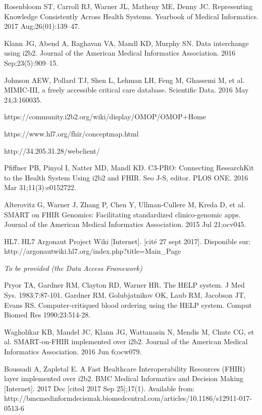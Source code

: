 \documentclass{amia}
\begin{document}
\begin{thebibliography}{1}
Rosenbloom ST, Carroll RJ, Warner JL, Matheny ME, Denny JC. Representing Knowledge Consistently Across Health Systems. Yearbook of Medical Informatics. 2017 Aug;26(01):139--47. 

Klann JG, Abend A, Raghavan VA, Mandl KD, Murphy SN. Data interchange using i2b2. Journal of the American Medical Informatics Association. 2016 Sep;23(5):909–15. 

Johnson AEW, Pollard TJ, Shen L, Lehman LH, Feng M, Ghassemi M, et al. MIMIC-III, a freely accessible critical care database. Scientific Data. 2016 May 24;3:160035. 

https://community.i2b2.org/wiki/display/OMOP/OMOP+Home

https://www.hl7.org/fhir/conceptmap.html

http://34.205.31.28/webclient/

Pfiffner PB, Pinyol I, Natter MD, Mandl KD. C3-PRO: Connecting ResearchKit to the Health System Using i2b2 and FHIR. Seo J-S, editor. PLOS ONE. 2016 Mar 31;11(3):e0152722. 

Alterovitz G, Warner J, Zhang P, Chen Y, Ullman-Cullere M, Kreda D, et al. SMART on FHIR Genomics: Facilitating standardized clinico-genomic apps. Journal of the American Medical Informatics Association. 2015 Jul 21;ocv045. 

HL7. HL7 Argonaut Project Wiki [Internet]. [cité 27 sept 2017]. Disponible sur: http://argonautwiki.hl7.org/index.php?title=Main\_Page

\emph{To be provided (the Data Access Framework)}

Pryor TA, Gardner RM, Clayton RD, Warner HR. The HELP system. J Med Sys. 1983;7:87-101.
Gardner RM, Golubjatnikov OK, Laub RM, Jacobson JT, Evans RS. Computer-critiqued blood ordering using the HELP system. Comput Biomed Res 1990;23:514-28.

Wagholikar KB, Mandel JC, Klann JG, Wattanasin N, Mendis M, Chute CG, et al. SMART-on-FHIR implemented over i2b2. Journal of the American Medical Informatics Association. 2016 Jun 6;ocw079. 

Boussadi A, Zapletal E. A Fast Healthcare Interoperability Resources (FHIR) layer implemented over i2b2. BMC Medical Informatics and Decision Making [Internet]. 2017 Dec [cited 2017 Sep 25];17(1). Available from: http://bmcmedinformdecismak.biomedcentral.com/articles/10.1186/s12911-017-0513-6


\end{thebibliography}
\end{document}
